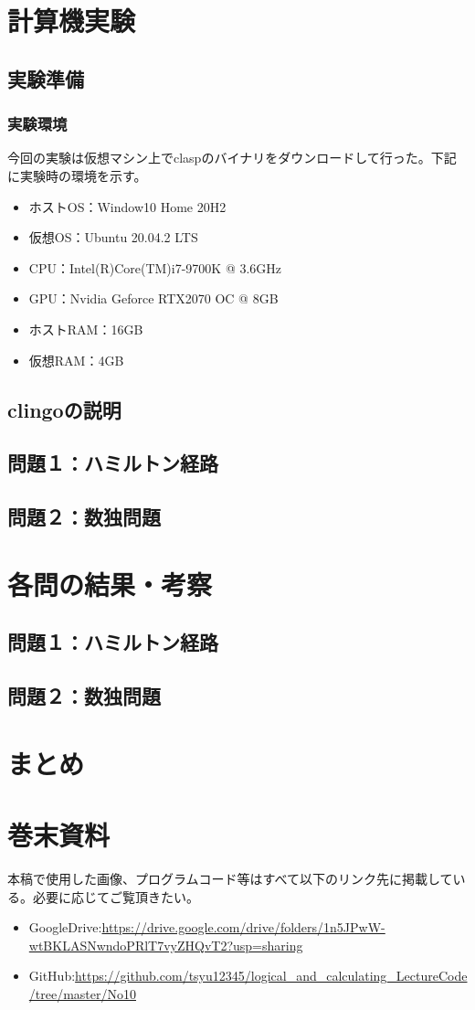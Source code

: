 \documentclass[dvipdfmx]{jsarticle}
\begin{document}
\section{計算機実験}
\subsection{実験準備}
  \subsubsection{実験環境}
  今回の実験は仮想マシン上でclaspのバイナリをダウンロードして行った。下記に実験時の環境を示す。
  \begin{itemize}
    \item ホストOS：Window10 Home 20H2
    \item 仮想OS：Ubuntu 20.04.2 LTS
    \item CPU：Intel(R)Core(TM)i7-9700K @ 3.6GHz
    \item GPU：Nvidia Geforce RTX2070 OC @ 8GB
    \item ホストRAM：16GB
    \item 仮想RAM：4GB
  \end{itemize}
\subsection{clingoの説明}
\subsection{問題１：ハミルトン経路}
\subsection{問題２：数独問題}

\section{各問の結果・考察}
\subsection{問題１：ハミルトン経路}
\subsection{問題２：数独問題}

\section{まとめ}
\section{巻末資料}
本稿で使用した画像、プログラムコード等はすべて以下のリンク先に掲載している。必要に応じてご覧頂きたい。
\begin{itemize}
  \item GoogleDrive:\url{https://drive.google.com/drive/folders/1n5JPwW-wtBKLASNwndoPRlT7vyZHQvT2?usp=sharing}
  \item GitHub:\url{https://github.com/tsyu12345/logical_and_calculating_LectureCode/tree/master/No10}
\end{itemize}
\end{document}
